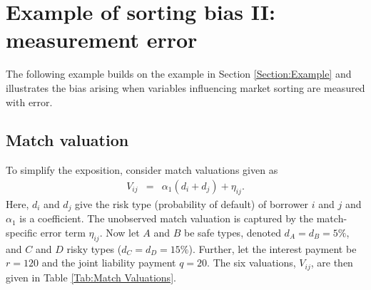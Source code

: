 \section{Example of sorting bias II: measurement error} \label{Appendix:Example}

The following example builds on the example in Section \ref{Section:Example} and illustrates the bias arising when variables influencing market sorting are measured with error. 



\subsection{Match valuation}

To simplify the exposition, consider match valuations given as
\begin{eqnarray} \label{Eqn:IntroExampleValuationEquationTheoryP}
V_{ij} %
       &=& \alpha_1(d_i + d_j) + \eta_{ij}.
\end{eqnarray} 
Here, $d_i$ and $d_j$ give the risk type (probability of default) of borrower $i$ and $j$ and $\alpha_1$ is a coefficient. The unobserved match valuation is captured by the match-specific error term $\eta_{ij}$. Now let $A$ and $B$ be safe types, denoted $d_A=d_B=5\%$, and $C$ and $D$ risky types ($d_C=d_D=15\%$). Further, let the interest payment be $r=120$ and the joint liability payment $q=20$. The six valuations, $V_{ij}$, are then given in Table \ref{Tab:Match Valuations}.

